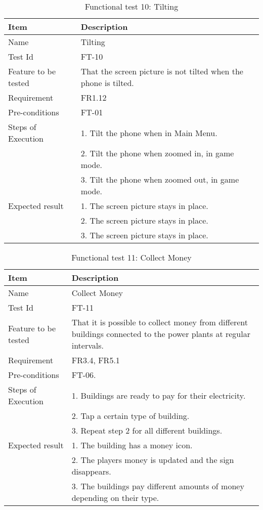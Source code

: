 \begin{table}[H]
\centering
	\begin{tabular}{ l | p{8cm} }
		\hline
		\rowcolor{lightgray}
		{\bf Item} & {\bf Description} \\ \hline
		Name & Tilting \\ 
		Test Id & FT-10 \\ 
		Feature to be tested & That the screen picture is not tilted when the phone is tilted. \\ 
		Requirement & FR1.12 \\ 
		Pre-conditions & FT-01 \\ 
		Steps of Execution & 1. Tilt the phone when in Main Menu. \\
		& 2. Tilt the phone when zoomed in, in game mode. \\
		& 3. Tilt the phone when zoomed out, in game mode. \\
		Expected result & 1. The screen picture stays in place. \\ 
		& 2. The screen picture stays in place. \\
		& 3. The screen picture stays in place. \\
		\hline
	\end{tabular}
	\caption{Functional test 10: Tilting}
\end{table}

\begin{table}[H]
\centering
	\begin{tabular}{ l | p{8cm} }
		\hline
		\rowcolor{lightgray}
		{\bf Item} & {\bf Description} \\ \hline
		Name & Collect Money \\ 
		Test Id & FT-11 \\ 
		Feature to be tested & That it is possible to collect money from different buildings connected to the power plants at regular intervals. \\
		Requirement & FR3.4, FR5.1 \\ 
		Pre-conditions & FT-06. \\ 
		Steps of Execution & 1. Buildings are ready to pay for their electricity. \\
		& 2. Tap a certain type of building. \\ 
		& 3. Repeat step 2 for all different buildings. \\
		Expected result & 1. The building has a money icon. \\
		& 2. The players money is updated and the sign disappears. \\
		& 3. The buildings pay different amounts of money depending on their type. \\
		\hline
	\end{tabular}
	\caption{Functional test 11: Collect Money}
\end{table}

